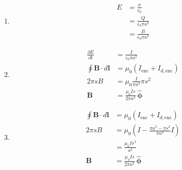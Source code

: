 \documentclass{article}
\renewcommand{\vec}[1]{\boldsymbol{\mathbf{#1}}}
\newcommand{\uvec}[1]{\hat{\vec{#1}}}
\begin{document}
\subsection{}

\begin{enumerate}
  \item

        \begin{align*}
          E & = \frac{\sigma}{\epsilon_0}      \\
            & = \frac{Q}{\epsilon_0 \pi a^2}   \\
            & = \frac{I t}{\epsilon_0 \pi a^2}
        \end{align*}

  \item

        \begin{align*}
          \frac{\partial E}{\partial t} & = \frac{I}{\epsilon_0 \pi a^2}              \\
          \oint \vec{B} \cdot d \vec{l} & = \mu_0 (I_\text{enc} + I_{d,\text{enc}})   \\
          2 \pi s B                     & = \mu_0 \frac{I}{\pi a^2} \pi s^2           \\
          \vec{B}                       & = \frac{\mu_0 I s}{2 \pi a^2} \,\uvec{\phi}
        \end{align*}

  \item

        \begin{align*}
          \oint \vec{B} \cdot d \vec{l} & = \mu_0 (I_\text{enc} + I_{d,\text{enc}})                      \\
          2 \pi s B                     & = \mu_0 \left( I - \frac{\pi a^2 - \pi s^2}{\pi a^2} I \right) \\
                                        & = \frac{\mu_0 I s^2}{a^2}                                      \\
          \vec{B}                       & = \frac{\mu_0 I s}{2 \pi a^2} \,\uvec{\phi}
        \end{align*}
\end{enumerate}

\subsection{}
\end{document}
